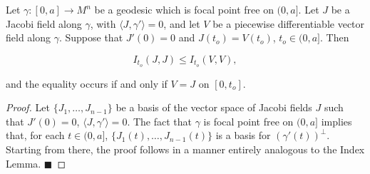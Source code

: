 \begin{lemma}
  \label{lem:dc-ch10-4-8}
  Let $\gamma:[0,a]\to M^n$ be a geodesic which is focal point free on $(0,a]$. Let
  $J$ be a Jacobi field along $\gamma$, with $\langle J,\gamma'\rangle=0$, and let
  $V$ be a piecewise differentiable vector field along $\gamma$. Suppose that
  $J'(0)=0$ and $J(t_o)=V(t_o)$, $t_o\in(0,a]$. Then
  
  $$
  I_{t_o}(J,J)\leq I_{t_o}(V,V),
  $$
  
  and the equality occurs if and only if $V=J$ on $[0,t_o]$.
\end{lemma}
\begin{proof}
  Let $\{J_1,\dots,J_{n-1}\}$ be a basis of the vector space of Jacobi
  fields $J$ such that $J'(0)=0$, $\langle J,\gamma'\rangle=0$. The fact that
  $\gamma$ is focal point free on $(0,a]$ implies that, for each $t\in(0,a]$,
  $\{J_1(t),\dots,J_{n-1}(t)\}$ is a basis for $(\gamma'(t))^\perp$. Starting from
  there, the proof follows in a manner entirely analogous to the Index Lemma. $\blacksquare$
\end{proof}

